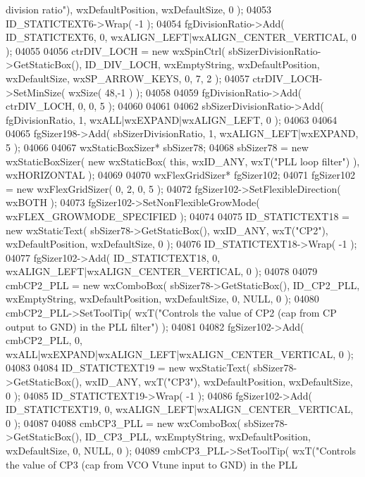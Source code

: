 \begin{DoxyCode}
{       division ratio"}), wxDefaultPosition, wxDefaultSize, 0 );
04053     ID_STATICTEXT6->Wrap( -1 );
04054     fgDivisionRatio->Add( ID_STATICTEXT6, 0, wxALIGN\_LEFT|wxALIGN\_CENTER\_VERTICAL, 0 );
04055     
04056     ctrDIV_LOCH = \textcolor{keyword}{new} wxSpinCtrl( sbSizerDivisionRatio->GetStaticBox(), 
      ID_DIV_LOCH, wxEmptyString, wxDefaultPosition, wxDefaultSize, wxSP\_ARROW\_KEYS, 0, 7, 2 );
04057     ctrDIV_LOCH->SetMinSize( wxSize( 48,-1 ) );
04058     
04059     fgDivisionRatio->Add( ctrDIV_LOCH, 0, 0, 5 );
04060     
04061     
04062     sbSizerDivisionRatio->Add( fgDivisionRatio, 1, wxALL|wxEXPAND|wxALIGN\_LEFT, 0 );
04063     
04064     
04065     fgSizer198->Add( sbSizerDivisionRatio, 1, wxALIGN\_LEFT|wxEXPAND, 5 );
04066     
04067     wxStaticBoxSizer* sbSizer78;
04068     sbSizer78 = \textcolor{keyword}{new} wxStaticBoxSizer( \textcolor{keyword}{new} wxStaticBox( \textcolor{keyword}{this}, wxID\_ANY, wxT(\textcolor{stringliteral}{"PLL loop filter"}) ), 
      wxHORIZONTAL );
04069     
04070     wxFlexGridSizer* fgSizer102;
04071     fgSizer102 = \textcolor{keyword}{new} wxFlexGridSizer( 0, 2, 0, 5 );
04072     fgSizer102->SetFlexibleDirection( wxBOTH );
04073     fgSizer102->SetNonFlexibleGrowMode( wxFLEX\_GROWMODE\_SPECIFIED );
04074     
04075     ID_STATICTEXT18 = \textcolor{keyword}{new} wxStaticText( sbSizer78->GetStaticBox(), wxID\_ANY, wxT(\textcolor{stringliteral}{"CP2"}), wxDefaultPosition,
       wxDefaultSize, 0 );
04076     ID_STATICTEXT18->Wrap( -1 );
04077     fgSizer102->Add( ID_STATICTEXT18, 0, wxALIGN\_LEFT|wxALIGN\_CENTER\_VERTICAL, 0 );
04078     
04079     cmbCP2_PLL = \textcolor{keyword}{new} wxComboBox( sbSizer78->GetStaticBox(), ID_CP2_PLL, wxEmptyString, wxDefaultPosition, 
      wxDefaultSize, 0, NULL, 0 ); 
04080     cmbCP2_PLL->SetToolTip( wxT(\textcolor{stringliteral}{"Controls the value of CP2 (cap from CP output to GND) in the PLL filter"}) 
      );
04081     
04082     fgSizer102->Add( cmbCP2_PLL, 0, wxALL|wxEXPAND|wxALIGN\_LEFT|wxALIGN\_CENTER\_VERTICAL, 0 );
04083     
04084     ID_STATICTEXT19 = \textcolor{keyword}{new} wxStaticText( sbSizer78->GetStaticBox(), wxID\_ANY, wxT(\textcolor{stringliteral}{"CP3"}), wxDefaultPosition,
       wxDefaultSize, 0 );
04085     ID_STATICTEXT19->Wrap( -1 );
04086     fgSizer102->Add( ID_STATICTEXT19, 0, wxALIGN\_LEFT|wxALIGN\_CENTER\_VERTICAL, 0 );
04087     
04088     cmbCP3_PLL = \textcolor{keyword}{new} wxComboBox( sbSizer78->GetStaticBox(), ID_CP3_PLL, wxEmptyString, wxDefaultPosition, 
      wxDefaultSize, 0, NULL, 0 ); 
04089     cmbCP3_PLL->SetToolTip( wxT(\textcolor{stringliteral}{"Controls the value of CP3 (cap from VCO Vtune input to GND) in the PLL
}
\end{DoxyCode}
